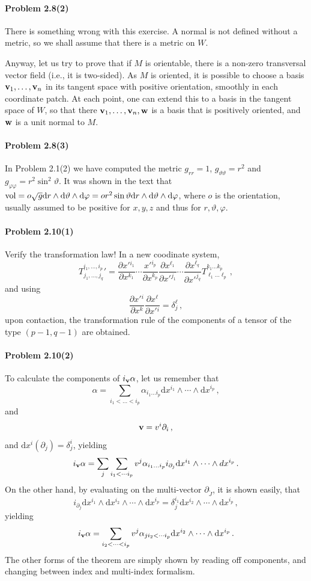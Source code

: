 \documentclass[a4paper,12pt]{article}
\def\d{\mathrm{d}}
\newcommand{\problem}[1]{\paragraph{Problem #1}}
\begin{document}
\problem{2.8(2)} There is something wrong with this exercise. A normal is not defined without a metric, so we shall assume that there is a metric on $W$.

Anyway, let us try to prove that if $M$ is orientable, there is a non-zero transversal vector field (i.e., it is two-sided). As $M$ is oriented, it is possible to choose a basis ${\bf v}_1, \dots, {\bf v}_n$ in its tangent space with positive orientation, smoothly in each coordinate patch. At each point, one can extend this to a basis in the tangent space of $W$, so that there ${\bf v}_1, \dots, {\bf v}_n, {\bf w}$ is a basis that is positively oriented, and ${\bf w}$ is a unit normal to $M$.


\problem{2.8(3)} In Problem 2.1(2) we have computed the metric $g_{rr}=1$, $g_{\vartheta\vartheta} = r^2$ and $g_{\varphi\varphi} = r^2 \sin^2\vartheta$. It was shown in the text that ${\rm vol} = o \sqrt{g} \d r\wedge \d \vartheta \wedge \d \varphi = o r^2 \sin\vartheta \d r\wedge \d \vartheta \wedge \d \varphi$, where $o$ is the orientation, usually assumed to be positive for $x, y, z$ and thus for $r, \vartheta, \varphi$.


\problem{2.10(1)} Verify the transformation law! In a new coodinate system,
\[
 T^{i_1, \dots, i_p}_{j_1, \dots, j_q}{}' = \frac{\partial x'{}^{i_1}}{\partial x^{k_1}} \cdots \frac{x'{}^{i_p}}{\partial x^{k_p}}\frac{\partial x^{\ell_1}}{\partial x'{}^{j_1}}\cdots \frac{\partial x^{\ell_q}}{\partial x'{}^{j_q}} T^{k_1\dots k_p}_{\ell_1\dots\ell_p}\,,
\]
and using
\[
 \frac{\partial x'{}^i}{\partial x^k}\frac{\partial x^\ell}{\partial x'{}^i} = \delta^\ell_j\,,
\]
upon contaction, the transformation rule of the components of a tensor of the type $(p-1, q-1)$ are obtained.


\problem{2.10(2)} To calculate the components of $i_{\bf v}\alpha$, let us remember that
\[
 \alpha = \sum_{i_1 < \dots < i_p} \alpha_{i_1\dots i_p}\d x^{i_1}\wedge \cdots \wedge \d x^{i_p}\,,
\]
and
\[
 {\bf v} = v^i \partial_i\,,
\]
and $\d x^i(\partial_j) = \delta^i_j$, yielding
\[
 i_{\bf v}\alpha = \sum_j \sum_{i_1 < \cdots i_p}v^j \alpha_{i_1\dots i_p}i_{\partial_j}\d x^{i_1}\wedge \cdots \wedge d x^{i_p}\,.
\]
On the other hand, by evaluating on the multi-vector $\partial_{\underrightarrow J}$, it is shown easily, that
\[
 i_{\partial_j}\d x^{i_1} \wedge \d x^{i_2} \wedge\cdots \wedge \d x^{i_p} = \delta^{i_1}_j \d x^{i_2}\wedge \cdots \wedge \d x^{i_p}\,,
\]
yielding
\[
 i_{\bf v}\alpha = \sum_{i_2 < \cdots < i_p}v^j \alpha_{j i_2< \cdots i_p}\d x^{i_2}\wedge \cdots \wedge \d x^{i_p}\,.
\]
The other forms of the theorem are simply shown by reading off components, and changing between index and multi-index formalism.
\end{document}
